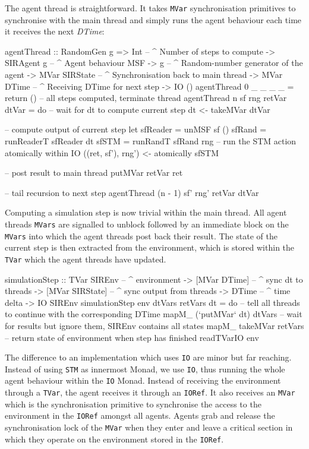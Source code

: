 The agent thread is straightforward. It takes \texttt{MVar} synchronisation primitives to synchronise with the main thread and simply runs the agent behaviour each time it receives the next \textit{DTime}:

\begin{HaskellCode}
agentThread :: RandomGen g 
            => Int             -- ^ Number of steps to compute
            -> SIRAgent g      -- ^ Agent behaviour MSF
            -> g               -- ^ Random-number generator of the agent
            -> MVar SIRState   -- ^ Synchronisation back to main thread
            -> MVar DTime      -- ^ Receiving DTime for next step
            -> IO ()
agentThread 0 _ _ _ _ = return () -- all steps computed, terminate thread
agentThread n sf rng retVar dtVar = do
  -- wait for dt to compute current step
  dt <- takeMVar dtVar

  -- compute output of current step
  let sfReader = unMSF sf ()
      sfRand   = runReaderT sfReader dt
      sfSTM    = runRandT sfRand rng
  -- run the STM action atomically within IO
  ((ret, sf'), rng') <- atomically sfSTM 

  -- post result to main thread
  putMVar retVar ret
  
  -- tail recursion to next step 
  agentThread (n - 1) sf' rng' retVar dtVar
\end{HaskellCode}

Computing a simulation step is now trivial within the main thread. All agent threads \texttt{MVars} are signalled to unblock followed by an immediate block on the \texttt{MVars} into which the agent threads post back their result. The state of the current step is then extracted from the environment, which is stored within the \texttt{TVar} which the agent threads have updated.

\begin{HaskellCode}
simulationStep :: TVar SIREnv     -- ^ environment 
               -> [MVar DTime]    -- ^ sync dt to threads
               -> [MVar SIRState] -- ^ sync output from threads
               -> DTime           -- ^ time delta
               -> IO SIREnv
simulationStep env dtVars retVars dt = do
  -- tell all threads to continue with the corresponding DTime
  mapM_ (`putMVar` dt) dtVars
  -- wait for results but ignore them, SIREnv contains all states
  mapM_ takeMVar retVars
  -- return state of environment when step has finished
  readTVarIO env
\end{HaskellCode}

The difference to an implementation which uses \texttt{IO} are minor but far reaching. Instead of using \texttt{STM} as innermost Monad, we use \texttt{IO}, thus running the whole agent behaviour within the \texttt{IO} Monad. Instead of receiving the environment through a \texttt{TVar}, the agent receives it through an \texttt{IORef}. It also receives an \texttt{MVar} which is the synchronisation primitive to synchronise the access to the environment in the \texttt{IORef} amongst all agents. Agents grab and release the synchronisation lock of the \texttt{MVar} when they enter and leave a critical section in which they operate on the environment stored in the \texttt{IORef}.